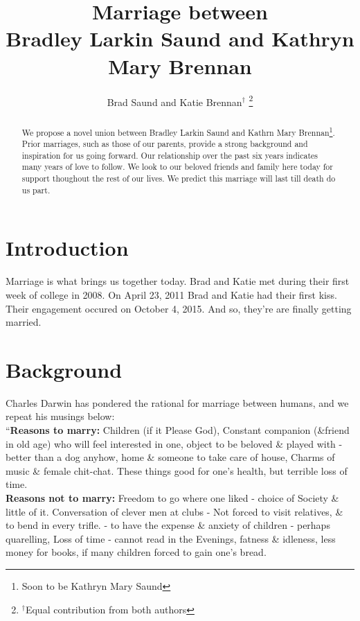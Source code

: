 \documentclass[letterpaper, 11 pt, conference]{ieeeconf}
\title{\LARGE \bf
  Marriage between \\
  Bradley Larkin Saund and Kathryn Mary Brennan
}
\author{Brad Saund and Katie Brennan$^{\dagger}$
\thanks{${^\dagger}$Equal contribution from both authors}%
}
\begin{document}
\maketitle
\thispagestyle{empty}
\pagestyle{empty}


\begin{abstract}
  We propose a novel union between Bradley Larkin Saund and Kathrn Mary Brennan\footnote{Soon to be Kathryn Mary Saund}.
  Prior marriages, such as those of our parents, provide a strong background and inspiration for us going forward.
  Our relationship over the past six years indicates many years of love to follow.
  We look to our beloved friends and family here today for support thoughout the rest of our lives.
  We predict this marriage will last till death do us part.
  
\end{abstract}


\section{Introduction}
Marriage is what brings us together today\cite{PrincessBride}.
Brad and Katie met during their first week of college in 2008.
On April 23, 2011 Brad and Katie had their first kiss.
Their engagement occured on October 4, 2015.
And so, they're are finally getting married\cite{AladdinKoT}.


\section{Background}
Charles Darwin has pondered the rational for marriage between humans, and we repeat his musings below:\\
``\textbf{Reasons to marry:} Children (if it Please God), Constant companion (\&friend in old age) who will feel interested in one, object to be beloved \& played with - better than a dog anyhow, home \& someone to take care of house, Charms of music \& female chit-chat. These things good for one's health, but terrible loss of time.\\
\textbf{Reasons not to marry:} Freedom to go where one liked - choice of Society \& little of it. Conversation of clever men at clubs - Not forced to visit relatives, \& to bend in every trifle. - to have the expense \& anxiety of children - perhaps quarelling, Loss of time - cannot read in the Evenings, fatness \& idleness, less money for books, if many children forced to gain one's bread.
\end{document}
